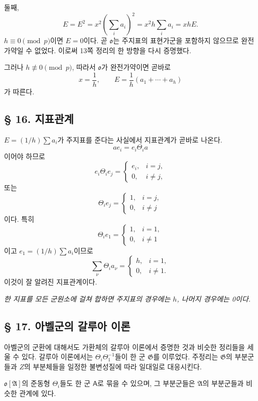 둘째,
\[
        E=E^2
        =x^2\left(\sum_i a_i\right)^2
        =x^2h\sum_i a_i=xhE.
\]
\(h\equiv0\pmod p\)이면 \(E=0\)이다. 곧 \(\mathfrak o\)는 주지표의 표현가군을 포함하지 않으므로 완전가약일 수 없었다. 이로써 13쪽 정리의 한 방향을 다시 증명했다.

그러나 \(h\not\equiv0\pmod p\), 따라서 \(\mathfrak o\)가 완전가약이면 곧바로
\[
        x=\frac1h,
        \qquad
        E=\frac1h(a_1+\cdots+a_h)
\]
가 따른다.

\subsection*{§ 16. 지표관계}

\(E=(1/h)\sum a_i\)가 주지표를 준다는 사실에서 지표관계가 곧바로 나온다.
\[
        a e_i=e_i\Theta_i a
\]
이어야 하므로
\[
        e_i\Theta_i e_j
        =\begin{cases}
          e_i,&i=j,\\
          0,&i\ne j,
        \end{cases}
\]
또는
\[
        \Theta_i e_j
        =\begin{cases}
          1,&i=j,\\
          0,&i\ne j
        \end{cases}
\]
이다. 특히
\[
        \Theta_i e_1
        =\begin{cases}
          1,&i=1,\\
          0,&i\ne1
        \end{cases}
\]
이고 \(e_1=(1/h)\sum a_i\)이므로
\[
        \sum_\nu\Theta_i a_\nu
        =\begin{cases}
          h,&i=1,\\
          0,&i\ne1.
        \end{cases}
\]
이것이 잘 알려진 지표관계이다.

\emph{한 지표를 모든 군원소에 걸쳐 합하면 주지표의 경우에는 \(h\), 나머지 경우에는 0이다.}

\subsection*{§ 17. 아벨군의 갈루아 이론}

아벨군의 군환에 대해서도 가환체의 갈루아 이론에서 증명한 것과 비슷한 정리들을 세울 수 있다. 갈루아 이론에서는 \(\Theta_i\Theta_1^{-1}\)들이 한 군 \(\mathfrak G\)를 이루었다. 주정리는 \(\mathfrak G\)의 부분군들과 \(Z\)의 부분체들을 일정한 불변성질에 따라 일대일로 대응시킨다.

\(\mathfrak o[\mathfrak A]\)의 준동형 \(\Theta_i\)들도 한 군 \(\mathsf A\)로 묶을 수 있으며, 그 부분군들은 \(\mathfrak A\)의 부분군들과 비슷한 관계에 있다.

